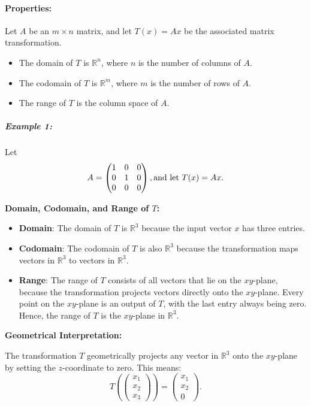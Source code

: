 \documentclass[a4paper,12pt]{article}
\begin{document}
\paragraph{Properties:}Let \( A \) be an \( m \times n \) matrix, and let \( T(x) = Ax \) be the associated matrix transformation.

\begin{itemize}
    \item The domain of \( T \) is \( \mathbb{R}^n \), where \( n \) is the number of columns of \( A \).
    \item The codomain of \( T \) is \( \mathbb{R}^m \), where \( m \) is the number of rows of \( A \).
    \item The range of \( T \) is the column space of \( A \).
\end{itemize}

\subparagraph{Example 1:}Let 
\[
A = \begin{pmatrix} 1 & 0 & 0 \\ 0 & 1 & 0 \\ 0 & 0 & 0 \end{pmatrix}, \text{and let \( T(x) = Ax \).}
\]


\textbf{Domain, Codomain, and Range of \( T \):}

\begin{itemize}
    \item \textbf{Domain}: The domain of \( T \) is \( \mathbb{R}^3 \) because the input vector \( x \) has three entries.
    \item \textbf{Codomain}: The codomain of \( T \) is also \( \mathbb{R}^3 \) because the transformation maps vectors in \( \mathbb{R}^3 \) to vectors in \( \mathbb{R}^3 \).
    \item \textbf{Range}: The range of \( T \) consists of all vectors that lie on the \( xy \)-plane, because the transformation projects vectors directly onto the \( xy \)-plane. Every point on the \( xy \)-plane is an output of \( T \), with the last entry always being zero. Hence, the range of \( T \) is the \( xy \)-plane in \( \mathbb{R}^3 \).
\end{itemize}

\textbf{Geometrical Interpretation:}

The transformation \( T \) geometrically projects any vector in \( \mathbb{R}^3 \) onto the \( xy \)-plane by setting the \( z \)-coordinate to zero. This means:
\[
T \left( \begin{pmatrix} x_1 \\ x_2 \\ x_3 \end{pmatrix} \right) = \begin{pmatrix} x_1 \\ x_2 \\ 0 \end{pmatrix}.
\]
\end{document}
